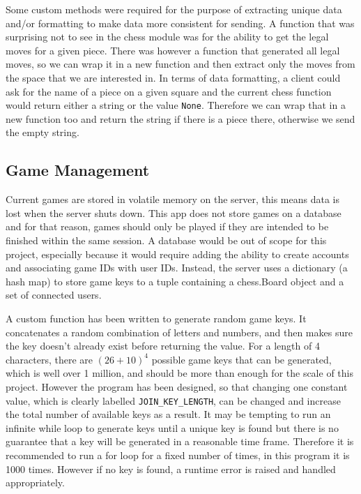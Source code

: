 Some custom methods were required for the purpose of extracting unique data and/or formatting to make data more consistent for sending. A function that was surprising not to see in the chess module was for the ability to get the legal moves for a given piece. There was however a function that generated all legal moves, so we can wrap it in a new function and then extract only the moves from the space that we are interested in. In terms of data formatting, a client could ask for the name of a piece on a given square and the current chess function would return either a string or the value \lstinline{None}. Therefore we can wrap that in a new function too and return the string if there is a piece there, otherwise we send the empty string.

\subsection{Game Management}
\label{GameManagement}

Current games are stored in volatile memory on the server, this means data is lost when the server shuts down. This app does not store games on a database and for that reason, games should only be played if they are intended to be finished within the same session. A database would be out of scope for this project, especially because it would require adding the ability to create accounts and associating game IDs with user IDs. Instead, the server uses a dictionary (a hash map) to store game keys to a tuple containing a chess.Board object and a set of connected users.

A custom function has been written to generate random game keys. It concatenates a random combination of letters and numbers, and then makes sure the key doesn't already exist before returning the value. For a length of 4 characters, there are $(26 + 10)^4$ possible game keys that can be generated, which is well over 1 million, and should be more than enough for the scale of this project. However the program has been designed, so that changing one constant value, which is clearly labelled \lstinline{JOIN_KEY_LENGTH}, can be changed and increase the total number of available keys as a result. It may be tempting to run an infinite while loop to generate keys until a unique key is found but there is no guarantee that a key will be generated in a reasonable time frame. Therefore it is recommended to run a for loop for a fixed number of times, in this program it is 1000 times. However if no key is found, a runtime error is raised and handled appropriately.

